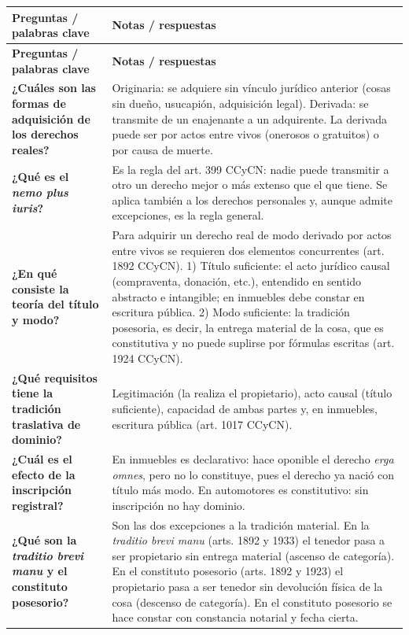 \documentclass[12pt,oneside]{book}
\begin{document}
\begin{longtable}{@{}>{\raggedright\arraybackslash}p{}>{\raggedright\arraybackslash}p{}@{}}
\toprule
\textbf{Preguntas / palabras clave} & \textbf{Notas / respuestas} \\
\midrule
\endfirsthead
\toprule
\textbf{Preguntas / palabras clave} & \textbf{Notas / respuestas} \\
\midrule
\endhead
\bottomrule
\endfoot

\textbf{¿Cuáles son las formas de adquisición de los derechos reales?} &
Originaria: se adquiere sin vínculo jurídico anterior (cosas sin dueño, usucapión, adquisición legal). Derivada: se transmite de un enajenante a un adquirente. La derivada puede ser por actos entre vivos (onerosos o gratuitos) o por causa de muerte. \\[0.8em]

\textbf{¿Qué es el \textit{nemo plus iuris}?} &
Es la regla del art. 399 CCyCN: nadie puede transmitir a otro un derecho mejor o más extenso que el que tiene. Se aplica también a los derechos personales y, aunque admite excepciones, es la regla general. \\[0.8em]

\textbf{¿En qué consiste la teoría del título y modo?} &
Para adquirir un derecho real de modo derivado por actos entre vivos se requieren dos elementos concurrentes (art. 1892 CCyCN). 1) Título suficiente: el acto jurídico causal (compraventa, donación, etc.), entendido en sentido abstracto e intangible; en inmuebles debe constar en escritura pública. 2) Modo suficiente: la tradición posesoria, es decir, la entrega material de la cosa, que es constitutiva y no puede suplirse por fórmulas escritas (art. 1924 CCyCN). \\[0.8em]

\textbf{¿Qué requisitos tiene la tradición traslativa de dominio?} &
Legitimación (la realiza el propietario), acto causal (título suficiente), capacidad de ambas partes y, en inmuebles, escritura pública (art. 1017 CCyCN). \\[0.8em]

\textbf{¿Cuál es el efecto de la inscripción registral?} &
En inmuebles es declarativo: hace oponible el derecho \textit{erga omnes}, pero no lo constituye, pues el derecho ya nació con título más modo. En automotores es constitutivo: sin inscripción no hay dominio. \\[0.8em]

\textbf{¿Qué son la \textit{traditio brevi manu} y el constituto posesorio?} &
Son las dos excepciones a la tradición material. En la \textit{traditio brevi manu} (arts. 1892 y 1933) el tenedor pasa a ser propietario sin entrega material (ascenso de categoría). En el constituto posesorio (arts. 1892 y 1923) el propietario pasa a ser tenedor sin devolución física de la cosa (descenso de categoría). En el constituto posesorio se hace constar con constancia notarial y fecha cierta. \\[0.8em]


\end{longtable}
\end{document}
